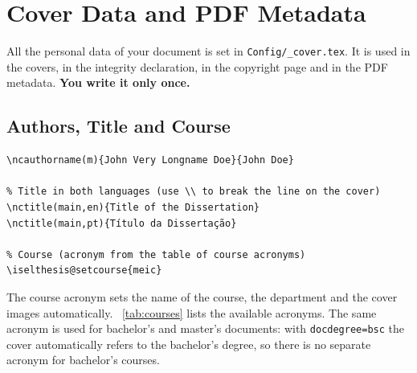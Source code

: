 \section{Cover Data and PDF Metadata} %
\label{sec:cover_data}

All the personal data of your document is set in \texttt{Config/\_cover.tex}. It is used in the covers, in the integrity declaration, in the copyright page and in the PDF metadata. \textbf{You write it only once.}

\subsection{Authors, Title and Course} %
\label{ssec:authors_title_course}

\begin{Verbatim}[breaklines=true, breakanywhere=true]
% Author: (m|f){Full name}{Short name} -- repeat for up to 3 authors (BSc)
\ncauthorname(m){John Very Longname Doe}{John Doe}

% Title in both languages (use \\ to break the line on the cover)
\nctitle(main,en){Title of the Dissertation}
\nctitle(main,pt){Título da Dissertação}

% Course (acronym from the table of course acronyms)
\iselthesis@setcourse{meic}
\end{Verbatim}

The course acronym sets the name of the course, the department and the cover images automatically. \tablename~\ref{tab:courses} lists the available acronyms. The same acronym is used for bachelor's and master's documents: with \texttt{docdegree=bsc} the cover automatically refers to the bachelor's degree, so there is no separate acronym for bachelor's courses.

